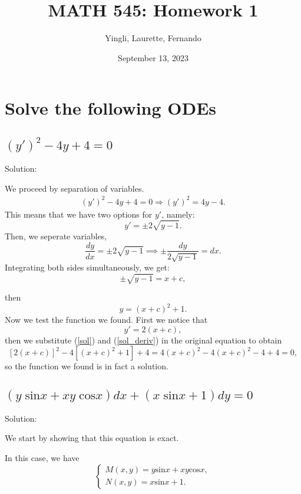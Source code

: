 \documentclass{article}
\title{MATH 545: Homework 1}
\author{Yingli, Laurette, Fernando}
\date{September 13, 2023}
\begin{document}
\maketitle
\section{Solve the following ODEs}
\subsection{$(y')^2 -4y +4 = 0$}

		Solution:

		We proceed by separation of variables.
		\begin{align*}
			(y')^2 -4y +4 = 0 \Longrightarrow (y')^2 = 4y -4. %
		\end{align*}
		This means that we have two options for $y'$, namely:
		\[y' = \pm 2\sqrt{y-1}.\]
	Then, we seperate variables,
	\[ \frac{dy}{dx} = \pm 2\sqrt{y-1} \implies \pm\frac{dy}{ 2\sqrt{y-1}} = dx.\]
		Integrating both sides simultaneously, we get:
		\[\pm \sqrt{y-1} = x+c,\]

		then
		\begin{equation} \label{sol}
			y = (x+c)^2 + 1.
		\end{equation}
		Now we test the function we found. First we notice that
		\begin{equation} \label{sol_deriv}
			y' = 2(x+c),
		\end{equation}
		then we substitute (\ref{sol}) and (\ref{sol_deriv}) in the original equation to obtain
		\[ [2(x+c)]^2 -4[(x+c)^2 + 1] +4= 4(x+c)^2 -4(x+c)^2 -4 + 4 =0,\]
		so the function we found is in fact a solution.

\subsection{$(y\;\text{sin} x + xy\;\text{cos}x)dx + (x\;\text{sin}x + 1)dy = 0$}

		Solution:
		
		We start by showing that this equation is exact.

		In this case, we have   
		\begin{equation*}
			\begin{cases}
				M(x,y) = y\text{sin}x + xy\text{cos}x,
				\\
				N(x,y) = x\text{sin}x + 1.
			\end{cases}
		\end{equation*}
	
\end{document}
